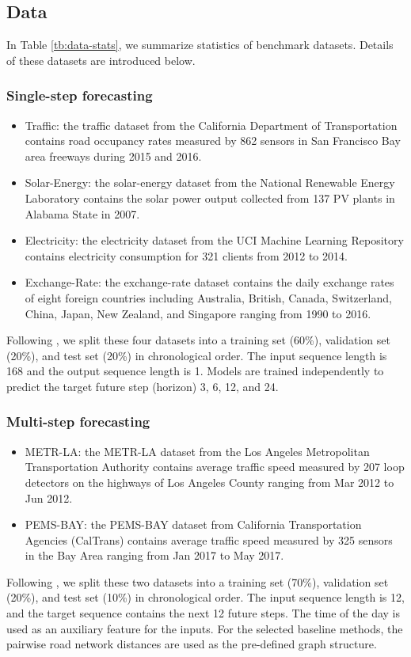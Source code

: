 \documentclass[sigconf]{acmart}
\begin{document}
\subsection{Data}\label{sec:dataset}
In Table \ref{tb:data-stats}, we summarize statistics of benchmark datasets. Details of these datasets are introduced below.

\subsubsection{Single-step forecasting}
\begin{itemize}
    \item Traffic: the traffic dataset from the California Department of Transportation contains road occupancy rates measured by 862 sensors in San Francisco Bay area freeways during 2015 and 2016.
    \item Solar-Energy: the solar-energy dataset from the National Renewable Energy Laboratory contains
    the solar power output collected from 137 PV plants in Alabama State in 2007.
    \item Electricity:  the electricity dataset from the UCI Machine Learning Repository contains electricity consumption for 321 clients from 2012 to 2014.
    \item Exchange-Rate: the exchange-rate dataset contains the daily exchange rates of eight foreign countries including Australia, British, Canada, Switzerland, China, Japan, New Zealand, and Singapore ranging from 1990 to 2016.
\end{itemize}
Following \cite{lai2018modeling}, we split these four datasets into a training set (60\%), validation set (20\%), and test set (20\%) in chronological order. The input sequence length is 168 and the output sequence length is 1.
Models are trained independently to predict the target future step (horizon) 3, 6, 12, and 24.

\subsubsection{Multi-step forecasting}
\begin{itemize}
    \item METR-LA: the METR-LA dataset from the Los Angeles Metropolitan Transportation Authority contains average traffic speed measured by 207 loop detectors 
    on the highways of Los Angeles County ranging from Mar 2012 to Jun 2012.
    \item PEMS-BAY: the PEMS-BAY dataset from California Transportation Agencies (CalTrans) contains average traffic speed measured by 325 sensors 
    in the Bay Area ranging from Jan 2017 to May 2017.
\end{itemize}
Following \cite{li2018diffusion}, we split these two datasets into a training set (70\%), validation set (20\%), and test set (10\%) in chronological order. The input sequence length is 12, and the target sequence contains the next 12 future steps.
The time of the day is used as an auxiliary feature for the inputs. For the selected baseline methods, the pairwise road network distances are used as the pre-defined graph structure.
\end{document}
